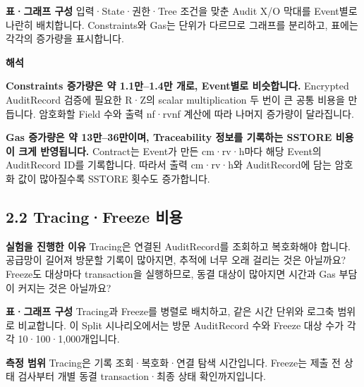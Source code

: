 \documentclass[11pt,a4paper]{article}
\begin{document}
\textbf{표·그래프 구성}\newline
입력·State·권한·Tree 조건을 맞춘 Audit X/O 막대를 Event별로 나란히 배치합니다.\newline
Constraints와 Gas는 단위가 다르므로 그래프를 분리하고, 표에는 각각의 증가량을 표시합니다.




\textbf{해석}

\textbf{Constraints 증가량은 약 1.1만--1.4만 개로, Event별로 비슷합니다.}\newline
Encrypted AuditRecord 검증에 필요한 R·Z의 scalar multiplication 두 번이 큰 공통 비용을 만듭니다.\newline
암호화할 Field 수와 출력 nf·rvnf 계산에 따라 나머지 증가량이 달라집니다.

\textbf{Gas 증가량은 약 13만--36만이며, Traceability 정보를 기록하는 SSTORE 비용이 크게 반영됩니다.}\newline
Contract는 Event가 만든 cm·rv·h마다 해당 Event의 AuditRecord ID를 기록합니다.\newline
따라서 출력 cm·rv·h와 AuditRecord에 담는 암호화 값이 많아질수록 SSTORE 횟수도 증가합니다.




\clearpage
{}\subsection*{2.2 Tracing·Freeze 비용}
\textbf{실험을 진행한 이유}\newline
Tracing은 연결된 AuditRecord를 조회하고 복호화해야 합니다.\newline
공급망이 길어져 방문할 기록이 많아지면, 추적에 너무 오래 걸리는 것은 아닐까요?\newline
Freeze도 대상마다 transaction을 실행하므로, 동결 대상이 많아지면 시간과 Gas 부담이 커지는 것은 아닐까요?

\textbf{표·그래프 구성}\newline
Tracing과 Freeze를 병렬로 배치하고, 같은 시간 단위와 로그축 범위로 비교합니다.\newline
이 Split 시나리오에서는 방문 AuditRecord 수와 Freeze 대상 수가 각각 10·100·1,000개입니다.

\textbf{측정 범위}\newline
Tracing은 기록 조회·복호화·연결 탐색 시간입니다.\newline
Freeze는 제출 전 상태 검사부터 개별 동결 transaction·최종 상태 확인까지입니다.\newline
\end{document}
